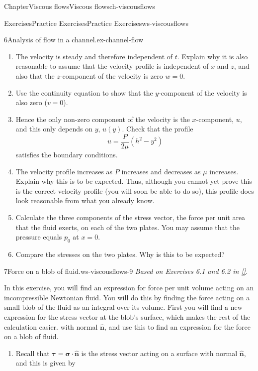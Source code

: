 \documentclass[oneside,10pt,]{book}
\newcommand{\xreffont}{\relax}
\numberwithin{equation}{section}
\newcommand{\bn}{\boldsymbol{n}}
\newcommand{\bsigma}{\boldsymbol{\sigma}}
\newcommand{\btau}{\boldsymbol{\tau}}
\begin{document}
\begin{chapterptx}{Chapter}{Viscous flows}{}{Viscous flows}{}{}{ch-viscousflows}
\begin{exercises-section}{Exercises}{Practice Exercises}{}{Practice Exercises}{}{}{ws-viscousflows}
\begin{divisionexercise}{6}{Analysis of flow in a channel.}{}{ex-channel-flow}
\begin{enumerate}[font=\bfseries,label=(\alph*),ref=\alph*]
\item{}The velocity is steady and therefore independent of \(t\). Explain why it is also reasonable to assume that the velocity profile is independent of \(x\) and \(z\), and also that the \(z\)-component of the velocity is zero \(w=0\).%
\item{}Use the continuity equation to show that the \(y\)-component of the velocity is also zero (\(v=0\)).%
\item{}Hence the only non-zero component of the velocity is the \(x\)-component, \(u\), and this only depends on \(y\), \(u(y)\). Check that the profile%
\begin{equation*}
u=\frac{P}{2\mu}\left(h^2-y^2\right)
\end{equation*}
satisfies the boundary conditions.%
\item{}The velocity profile increases as \(P\) increases and decreases as \(\mu\) increases. Explain why this is to be expected. Thus, although you cannot yet prove this is the correct velocity profile (you will soon be able to do so), this profile does look reasonable from what you already know.%
\item{}Calculate the three components of the stress vector, the force per unit area that the fluid exerts, on each of the two plates. You may assume that the pressure equals \(p_0\) at \(x=0\).%
\item{}Compare the stresses on the two plates. Why is this to be expected?%
\end{enumerate}%
\end{divisionexercise}%
\begin{divisionexercise}{7}{Force on a blob of fluid.}{}{ws-viscousflows-9}%
\emph{Based on Exercises 6.1 and 6.2 in \hyperlink{ref-acheson}{[{\xreffont 4}]}.}%
 \par
In this exercise, you will find an expression for force per unit volume acting on an incompressible Newtonian fluid. You will do this by finding the force acting on a small blob of the fluid as an integral over its volume. First you will find a new expression for the stress vector at the blob's surface, which makes the rest of the calculation easier. with normal \(\hat{\bn}\), and use this to find an expression for the force on a blob of fluid.%
\begin{enumerate}[font=\bfseries,label=(\alph*),ref=\alph*]%
\item{}Recall that \(\btau=\bsigma\cdot\hat{\bn}\) is the stress vector acting on a surface with normal \(\hat{\bn}\), and this is given by%
\begin{equation*}

\end{equation*}
\end{enumerate}
\end{divisionexercise}
\end{exercises-section}
\end{chapterptx}
\end{document}
